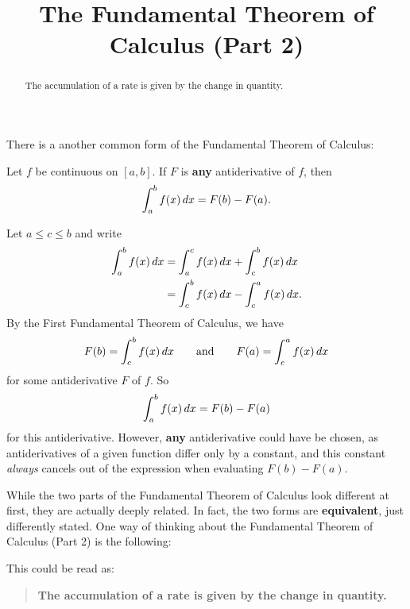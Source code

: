 \documentclass{ximera}
\title{The Fundamental Theorem of Calculus (Part 2)}
\begin{document}
\begin{abstract}
The accumulation of a rate is given by the change in quantity.
\end{abstract}
\maketitle

There is a another common form of the Fundamental Theorem of Calculus:

\begin{theorem}
  Let $f$ be continuous on $[a,b]$. If $F$ is \textbf{any}
  antiderivative of $f$, then
  \[
  \int_a^b f(x)\mathop{}\!d x = F(b)-F(a).
  \]
  \begin{explanation}
    Let $a\le c\le b$ and write
    \begin{align*}
      \int_a^b f(x) \mathop{}\!d x &= \int_a^c f(x) \mathop{}\!d x + \int_c^b f(x) \mathop{}\!d x \\
      &= \int_c^b f(x) \mathop{}\!d x - \int_c^a f(x) \mathop{}\!d x.
    \end{align*}
    By the First Fundamental Theorem of Calculus, we have
    \[
    F(b) = \int_c^b f(x) \mathop{}\!d x\qquad\text{and}\qquad F(a) = \int_c^a f(x) \mathop{}\!d x
    \] 
    for some antiderivative $F$ of $f$. So
    \[
    \int_a^b f(x) \mathop{}\!d x = F(b)-F(a)
    \]
    for this antiderivative. However, \textbf{any} antiderivative
    could have be chosen, as antiderivatives of a given function
    differ only by a constant, and this constant \textit{always}
    cancels out of the expression when evaluating $F(b)-F(a)$.
\end{explanation}
\end{theorem}

While the two parts of the Fundamental Theorem of Calculus look different at first, they are actually deeply related. In fact, the two forms are
\textbf{equivalent}, just differently stated. %
One way of thinking about the Fundamental Theorem of Calculus (Part 2) is the following:
\begin{image}
\end{image}
This could be read as:
\begin{quote}\large\textbf{The \textcolor{green!70!black!70!blue}{accumulation} of a \textcolor{blue!70!green}{rate} is given by the \textcolor{purple!50!blue!90!black}{change in quantity}.}
\end{quote}
\end{document}
